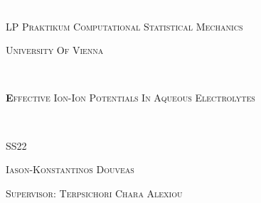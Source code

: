 \documentclass[10pt]{article}
\begin{document}

\begin{titlepage}
    \centering
    { \textcolor{white}{.} \par}
    \vspace{1cm}
    {\scshape \Large LP Praktikum Computational Statistical Mechanics \par}
    \vspace{0.5cm}
    {\scshape \Large University Of Vienna \par}
    \vspace{0.85cm}
    \hrulefill \\
    \vspace{0.15cm}
    {\scshape \LARGE \textbf Effective Ion-Ion Potentials In Aqueous Electrolytes  \par}
    \vspace{0.15cm}
    \hrulefill \\
    \vspace{0.85cm}
    {\scshape SS22 \par}
    \vspace{4cm}
    {\scshape \large Iason-Konstantinos Douveas \par}
    \vspace{1cm}
    {\scshape \large Supervisor: Terpsichori Chara Alexiou \par}
    \vspace{1cm}
    \vfill
    


\end{titlepage}
\newpage



\tableofcontents
\newpage


\begin{abstract}
    Computational simulations are a powerful tool for gaining qualitative and quantitative insight of various systems. In this work we will be using a variety of such computational tools, in order to perform simulations and derive desired quantities. The main goal is obtaining the effective ion-ion interaction potentials of Na and Cl for a coarse-grained system of an aqueous solution, in order to gain better insight into the dynamics of such ions. The initial simulation is performed on GROMACS that gives a trajectory, from which with a script on Python we derive the distribution statistics of the particles, which are finally given as input to MagiC for the derivation of the effective ion-ion potentials. Based on these results we will also be evaluating the methods used and how they affect the results obtained.
\end{abstract}
\end{document}
